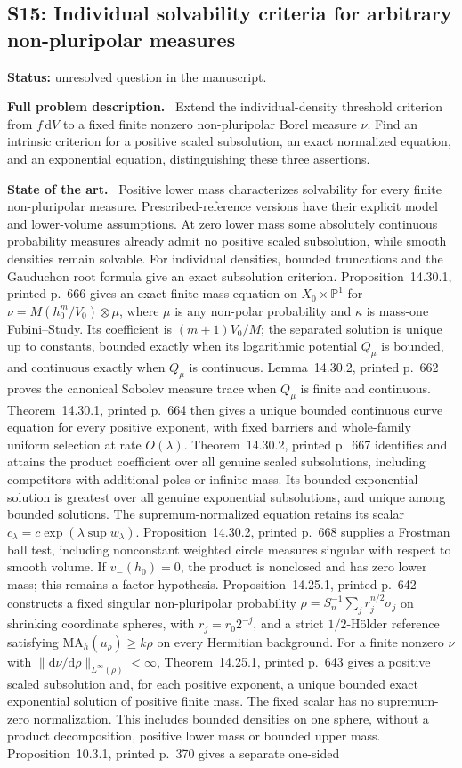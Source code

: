 \documentclass[11pt]{article}
\newcommand{\field}[1]{\par\medskip\noindent\textbf{#1.}\ }
\begin{document}
\subsection{S15: Individual solvability criteria for arbitrary non-pluripolar measures}
\label{S15}
\noindent\textbf{Status:} unresolved question in the manuscript.
\field{Full problem description} Extend the individual-density threshold criterion from $f\,\mathrm dV$ to a fixed finite nonzero non-pluripolar Borel measure $\nu$. Find an intrinsic criterion for a positive scaled subsolution, an exact normalized equation, and an exponential equation, distinguishing these three assertions.
\field{State of the art} Positive lower mass characterizes solvability for every finite non-pluripolar measure. Prescribed-reference versions have their explicit model and lower-volume assumptions. At zero lower mass some absolutely continuous probability measures already admit no positive scaled subsolution, while smooth densities remain solvable. For individual densities, bounded truncations and the Gauduchon root formula give an exact subsolution criterion. Proposition~14.30.1, printed p.~666 gives an exact finite-mass equation on $X_0\times\mathbb P^1$ for $\nu=M(h_0^m/V_0)\otimes\mu$, where $\mu$ is any non-polar probability and $\kappa$ is mass-one Fubini--Study. Its coefficient is $(m+1)V_0/M$; the separated solution is unique up to constants, bounded exactly when its logarithmic potential $Q_\mu$ is bounded, and continuous exactly when $Q_\mu$ is continuous. Lemma~14.30.2, printed p.~662 proves the canonical Sobolev measure trace when $Q_\mu$ is finite and continuous. Theorem~14.30.1, printed p.~664 then gives a unique bounded continuous curve equation for every positive exponent, with fixed barriers and whole-family uniform selection at rate $O(\lambda)$. Theorem~14.30.2, printed p.~667 identifies and attains the product coefficient over all genuine scaled subsolutions, including competitors with additional poles or infinite mass. Its bounded exponential solution is greatest over all genuine exponential subsolutions, and unique among bounded solutions. The supremum-normalized equation retains its scalar $c_\lambda=c\exp(\lambda\sup w_\lambda)$. Proposition~14.30.2, printed p.~668 supplies a Frostman ball test, including nonconstant weighted circle measures singular with respect to smooth volume. If $v_-(h_0)=0$, the product is nonclosed and has zero lower mass; this remains a factor hypothesis. Proposition~14.25.1, printed p.~642 constructs a fixed singular non-pluripolar probability $\rho=S_n^{-1}\sum_j r_j^{n/2}\sigma_j$ on shrinking coordinate spheres, with $r_j=r_0 2^{-j}$, and a strict $1/2$-H\"older reference satisfying $\mathrm{MA}_h(u_\rho)\geq k\rho$ on every Hermitian background. For a finite nonzero $\nu$ with $\|\mathrm d\nu/\mathrm d\rho\|_{L^\infty(\rho)}<\infty$, Theorem~14.25.1, printed p.~643 gives a positive scaled subsolution and, for each positive exponent, a unique bounded exact exponential solution of positive finite mass. The fixed scalar has no supremum-zero normalization. This includes bounded densities on one sphere, without a product decomposition, positive lower mass or bounded upper mass. Proposition~10.3.1, printed p.~370 gives a separate one-sided 
\end{document}
